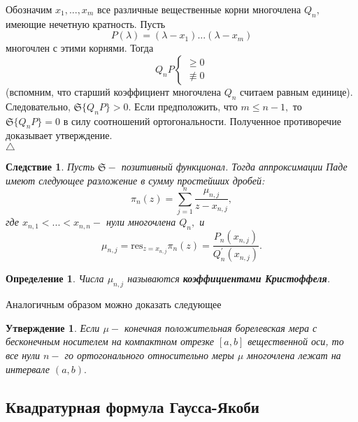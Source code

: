 \documentclass[12pt,a4paper]{article}
\theoremstyle{plain}   \newtheorem{Pro}{Задача}
\newtheorem{Sta}{Утверждение}
\newtheorem{Def}{Определение}
\newtheorem{Cor}{Следствие}
\begin{document}
Обозначим
$ x_1 ,...,x_m $
все различные вещественные корни многочлена
$ Q_n , $
имеющие нечетную кратность. Пусть
$$
  P(\lambda )=(\lambda -x_1 )...(\lambda -x_m )
$$
многочлен с этими корнями. Тогда
\begin{equation*}
  Q_n P
  \begin{cases}
    \geq 0 \\
	\not \equiv 0
  \end{cases}
\end{equation*}
(вспомним, что старший коэффициент многочлена
$ Q_n $
считаем равным единице). Следовательно,
$ \mathfrak{S} \{ Q_n P \} >0. $
Если предположить, что
$ m \leq n-1 , $
то
$ \mathfrak{S} \{ Q_n P \} =0 $
в силу соотношений ортогональности. Полученное противоречие
доказывает утверждение.\\
$ \triangle $
\begin{Cor}
Пусть
$ \mathfrak{S} - $
позитивный функционал. Тогда аппроксимации Паде имеют
следующее разложение в сумму простейших дробей:
$$
  \pi _n (z) = \sum _{j=1}^n
  \frac{\mu _{n,j}}{z-x_{n,j}},
$$
где
$ x_{n,1}<...<x_{n,n} - $
нули многочлена
$ Q_n , $
и
$$
  \mu _{n,j}=\mathrm{res}_{z=x_{n,j}} \pi _n (z) =
  \frac{P_n (x_{n,j})}{Q_n ^{\prime}(x_{n,j})}.
$$
\end{Cor}
\begin{Def}
Числа
$ \mu _{n,j} $
называются
{\bfseries коэффициентами Кристоффеля}.
\end{Def}
Аналогичным образом можно доказать следующее
\begin{Sta}
Если
$ \mu - $
конечная положительная борелевская мера с бесконечным носителем
на компактном отрезке
$ [a,b] $
вещественной оси, то все нули $ n- $ го ортогонального
относительно меры
$ \mu $
многочлена лежат на интервале
$ (a,b) . $
\end{Sta}
\newpage
\subsection{Квадратурная формула Гаусса-Якоби}
$ \; $
\\
\end{document}
